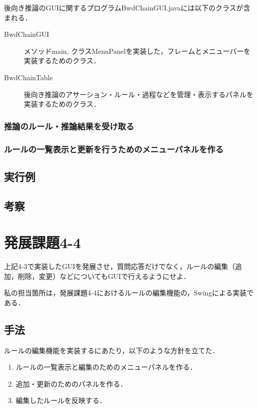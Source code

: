 \documentclass[12pt]{jarticle}
\begin{document}
後向き推論のGUIに関するプログラムBwdChainGUI.javaには以下のクラスが含まれる．
\begin{description}
\item[BwdChainGUI] メソッドmain, クラスMenuPanelを実装した，フレームとメニューバーを実装するためのクラス．
\item[BwdChainTable] 後向き推論のアサーション・ルール・過程などを管理・表示するパネルを実装するためのクラス．

\end{description}

\subsubsection{推論のルール・推論結果を受け取る}

\subsubsection{ルールの一覧表示と更新を行うためのメニューパネルを作る}


\clearpage

\subsection{実行例}

\clearpage

\subsection{考察}


\section{発展課題4-4}
\begin{screen}
上記4-3で実装したGUIを発展させ，質問応答だけでなく，ルールの編集（追加，削除，変更）などについてもGUIで行えるようにせよ．
\end{screen}
私の担当箇所は，発展課題4-4におけるルールの編集機能の，Swingによる実装である．

\subsection{手法}
ルールの編集機能を実装するにあたり，以下のような方針を立てた．
\begin{enumerate}
\item ルールの一覧表示と編集のためのメニューパネルを作る．
\item 追加・更新のためのパネルを作る．
\item 編集したルールを反映する．
\end{enumerate}
\end{document}
